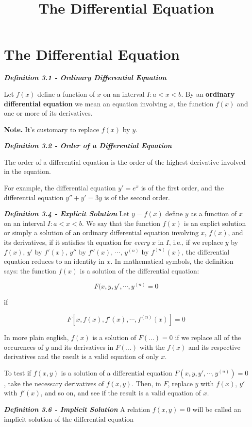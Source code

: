 \documentclass{article}
\title{The Differential Equation}
\begin{document}
\section{The Differential Equation}

\emph{\textbf{Definition 3.1 - Ordinary Differential Equation}}

Let $f(x)$ define a function of $x$ on an \@{interval} $I: a < x < b$. By an \textbf{ordinary differential equation} we mean an equation involving $x$, the function $f(x)$ and one or more of its derivatives.

\textbf{Note.} It's customary to replace $f(x)$ by $y$.

\emph{\textbf{Definition 3.2 - Order of a Differential Equation}}

The order of a differential equation is the order of the highest derivative involved in the equation.

For example, the differential equation $y' = e^x$ is of the first order, and the differential equation $y'' + y' = 3y$ is  of the second order.

\emph{\textbf{Definition 3.4 - Explicit Solution}}
Let $y = f(x)$ define $y$ as a function of $x$ on an \@{interval} $I: a < x < b$. We say that the function $f(x)$ is an explict solution or simply a solution of an ordinary differential equation involving $x$, $f(x)$, and its derivatives, if it satisfies th equation for \emph{every} $x$ in $I$, i.e., if we replace $y$ by $f(x)$, $y'$ by $f'(x)$, $y''$ by $f''(x)$, $\cdots$, $y^{(n)}$ by $f^{(n)}(x)$, the differential equation reduces to an identity in $x$. In mathematical symbols, the definition says: the function $f(x)$ is a solution of the differential equation:

\[ F(x,y,y',\cdots,y^{(n)} = 0 \]

if 

\[ F[x,f(x),f'(x),\cdots,f^{(n)}(x)] = 0 \]

In more plain english, $f(x)$ is a solution of $F(\ldots) = 0$ if we replace all of the occurences of $y$ and its derivatives in $F(...)$ with the $f(x)$ and its respective derivatives and the result is a valid equation of only $x$.

To test if $f(x,y)$ is a solution of a differential equation $F(x, y, y',\cdots,y^{(n)}) = 0$, take the necessary derivatives of $f(x,y)$. Then, in $F$, replace $y$ with $f(x)$, $y'$ with $f'(x)$, and so on, and see if the result is a valid equation of $x$.

\emph{\textbf{Definition 3.6 - Implicit Solution}}
A relation $f(x,y) = 0$ will be called an implicit solution of the differential equation
\end{document}
